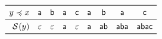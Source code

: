 \documentclass[10pt]{article}
\begin{document}
\TeXtoEPS
\(
\begin{array}{rccccccccc}
\toprule
y \preccurlyeq x & \word{a} & \word{b} & \word{a} & \word{c} 
 & \word{a} & \word{b} & \word{a} & \word{c}\\
\midrule
  \Border{}{y}
& \varepsilon & \varepsilon & \word{a} 
& \varepsilon & \word{a} & \word{ab} & \word{aba} & \word{abac}\\
\bottomrule
\end{array}
\)
\endTeXtoEPS
\end{document}
